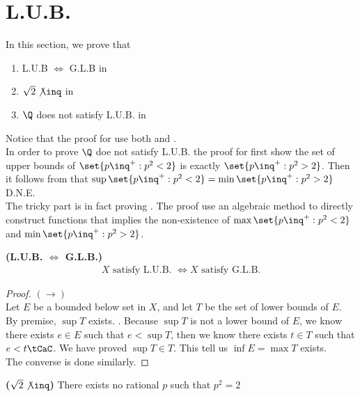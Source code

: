 \documentclass{report}
\begin{document}
\section{L.U.B.}
\begin{mdframed}
In this section, we prove that 
\begin{enumerate}[label=(\alph*)]
  \item L.U.B $\iff $ G.L.B in 
  \item $\sqrt{2} \not\inq$ in 
  \item $\Q$ does not satisfy L.U.B. in 
\end{enumerate}
Notice that the proof for  use both  and .\\

In order to prove $\Q$ doe not satisfy L.U.B. the proof for  first show the set of upper bounds of $\set{p\inq^+:p^2<2}$ is exactly $\set{p\inq^+:p^2>2}$. Then it follows from  that $\sup \set{p\inq^+:p^2<2}=\min \set{p\inq^+:p^2>2}$ D.N.E.\\

The tricky part is in fact proving  . The proof use an algebraic method to directly construct functions that implies the non-existence of $\max \set{p\inq^+:p^2<2}$ and $\min \set{p\inq^+:p^2>2}$.
\end{mdframed}
\begin{theorem}
\label{1.1.1}
\textbf{(L.U.B. $\iff $ G.L.B.)} 
\begin{align*}
X\text{ satisfy L.U.B. }\iff X\text{ satisfy G.L.B.}
\end{align*}
\end{theorem}
\begin{proof}
$(\longrightarrow)$\\

Let $E$ be a bounded below set in  $X$, and let $T$ be the set of lower bounds of  $E$. By premise, $\sup T$ exists. . Because $\sup T$ is not a lower bound of $E$, we know there exists  $e\in E$ such that $e<\sup T$, then we know there exists $t\in T$ such that $e<t\tCaC$. We have proved $\sup T\in T$. This tell us $\inf E=\max T$ exists.\\

The converse is done similarly. 
\end{proof}
\begin{theorem}
\label{1.1.2}
\textbf{($\sqrt{2}\not\inq$)}
There exists no rational $p$ such that $p^2=2$
\end{theorem}
\end{document}
